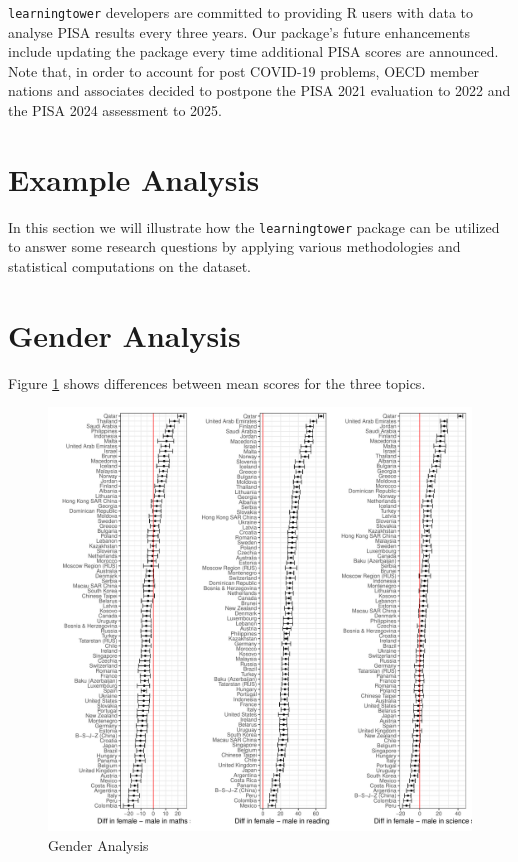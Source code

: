 \texttt{learningtower} developers are committed to providing R users
with data to analyse PISA results every three years. Our package's
future enhancements include updating the package every time additional
PISA scores are announced. Note that, in order to account for post
COVID-19 problems, OECD member nations and associates decided to
postpone the PISA 2021 evaluation to 2022 and the PISA 2024 assessment
to 2025.

\hypertarget{example-analysis}{%
\section{Example Analysis}\label{example-analysis}}

In this section we will illustrate how the \texttt{learningtower}
package can be utilized to answer some research questions by applying
various methodologies and statistical computations on the dataset.

\hypertarget{gender-analysis}{%
\section{Gender Analysis}\label{gender-analysis}}

Figure \ref{fig:score-differences} shows differences between mean scores
for the three topics.

\begin{Schunk}
\begin{figure}
\includegraphics[width=1\linewidth]{learningtower_files/figure-latex/score-differences-1} \caption[Gender Analysis]{Gender Analysis}\label{fig:score-differences}
\end{figure}
\end{Schunk}

